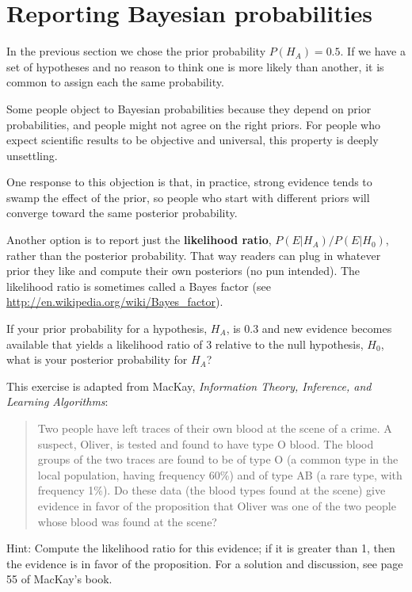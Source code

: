 \documentclass[12pt]{book}
\begin{document}
\section{Reporting Bayesian probabilities}

In the previous section we chose the prior probability $P(H_A) = 0.5$.
If we have a set of hypotheses and no reason to think one is more
likely than another, it is common to assign each the same probability.

Some people object to Bayesian probabilities because they depend on
prior probabilities, and people might not agree on
the right priors.  For people who expect scientific results to be
objective and universal, this property is deeply unsettling.

One response to this objection is that, in practice, strong evidence
tends to swamp the effect of the prior, so people who start with
different priors will converge toward the same posterior
probability.

Another option is to report just the {\bf likelihood ratio}, 
$P(E | H_A)/P(E | H_0)$, rather than the posterior probability.  That way
readers can plug in whatever prior they like and compute their own
posteriors (no pun intended).  The likelihood ratio is sometimes
called a Bayes factor (see \url{http://en.wikipedia.org/wiki/Bayes_factor}).

\begin{ex}

If your prior probability for a hypothesis, $H_A$, is 0.3 and new
evidence becomes available that yields a likelihood ratio of 3
relative to the null hypothesis, $H_0$, what is your posterior
probability for $H_A$?


\end{ex}


\begin{ex}

This exercise is adapted from MacKay, {\em Information
  Theory, Inference, and Learning Algorithms}:

\begin{quote}

Two people have left traces of their own blood at the scene of a
crime.  A suspect, Oliver, is tested and found to have type O blood.
The blood groups of the two traces are found to be of type O (a common
type in the local population, having frequency 60\%) and of type AB (a
rare type, with frequency 1\%).  Do these data (the blood types found
at the scene) give evidence in favor of the proposition that
Oliver was one of the two people whose blood was found at the scene?

\end{quote}

Hint: Compute the likelihood ratio for this evidence; if it is greater
than 1, then the evidence is in favor of the proposition.
For a solution and discussion, see page 55 of MacKay's book.

\end{ex}
\end{document}
